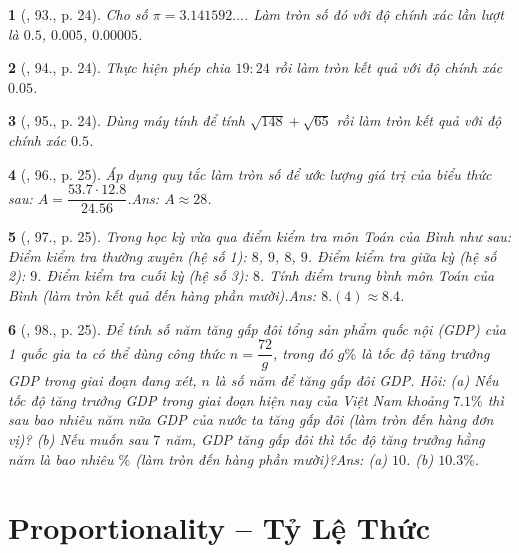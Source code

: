 \documentclass{article}
\newtheorem{baitoan}{}
\begin{document}
\begin{baitoan}[\cite{Tuyen_Toan_7}, 93., p. 24]
	Cho số $\pi = 3.141592\ldots$. Làm tròn số đó với độ chính xác lần lượt là $0.5$, $0.005$, $0.00005$.
\end{baitoan}

\begin{baitoan}[\cite{Tuyen_Toan_7}, 94., p. 24]
	Thực hiện phép chia $19:24$ rồi làm tròn kết quả với độ chính xác $0.05$.
\end{baitoan}

\begin{baitoan}[\cite{Tuyen_Toan_7}, 95., p. 24]
	Dùng máy  tính để tính $\sqrt{148} + \sqrt{65}$ rồi làm tròn kết quả với độ chính xác $0.5$.
\end{baitoan}

\begin{baitoan}[\cite{Tuyen_Toan_7}, 96., p. 25]
	Áp dụng quy tắc làm tròn số để ước lượng giá trị của biểu thức sau: $A = \dfrac{53.7\cdot 12.8}{24.56}$.\hfill{\sf Ans:} $A\approx 28$.
\end{baitoan}

\begin{baitoan}[\cite{Tuyen_Toan_7}, 97., p. 25]
	Trong học kỳ vừa qua điểm kiểm tra môn Toán của Bình như sau: Điểm kiểm tra thường xuyên (hệ số 1): $8$, $9$, $8$, $9$. Điểm kiểm tra giữa kỳ (hệ số 2): $9$. Điểm kiểm tra cuối kỳ (hệ số 3): $8$. Tính điểm trung bình môn Toán của Bình (làm tròn kết quả đến hàng phần mười).\hfill{\sf Ans:} $8.(4)\approx8.4$.
\end{baitoan}

\begin{baitoan}[\cite{Tuyen_Toan_7}, 98., p. 25]
	Để tính số năm tăng gấp đôi tổng sản phẩm quốc nội (GDP) của 1 quốc gia ta có thể dùng công thức $n = \dfrac{72}{g}$, trong đó $g\%$ là {\rm tốc độ tăng trưởng GDP} trong giai đoạn đang xét, $n$ là số năm để tăng gấp đôi GDP. Hỏi: (a) Nếu tốc độ tăng trưởng GDP trong giai đoạn hiện nay của Việt Nam khoảng $7.1\%$ thì sau bao nhiêu năm nữa GDP của nước ta tăng gấp đôi (làm tròn đến hàng đơn vị)? (b) Nếu muốn sau $7$ năm, GDP tăng gấp đôi thì tốc độ tăng trưởng hằng năm là bao nhiêu $\%$ (làm tròn đến hàng phần mười)?\hfill{\sf Ans:} (a) $10$. (b) $10.3\%$.
\end{baitoan}


\section{Proportionality -- Tỷ Lệ Thức}
\end{document}
